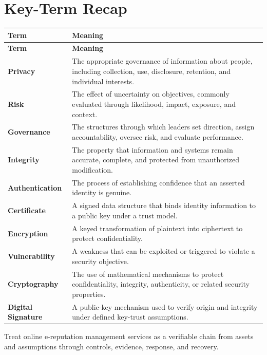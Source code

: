 \documentclass[11pt]{article}
\begin{document}
\section*{Key-Term Recap}
\begin{longtable}{>{\RaggedRight\arraybackslash}p{}>{\RaggedRight\arraybackslash}p{}}
\toprule\rowcolor{Navy}\color{white}\textbf{Term} & \color{white}\textbf{Meaning}\\\midrule
\endfirsthead
\toprule\rowcolor{Navy}\color{white}\textbf{Term} & \color{white}\textbf{Meaning}\\\midrule
\endhead
\textbf{Privacy} & The appropriate governance of information about people, including collection, use, disclosure, retention, and individual interests. \\\midrule
\textbf{Risk} & The effect of uncertainty on objectives, commonly evaluated through likelihood, impact, exposure, and context. \\\midrule
\textbf{Governance} & The structures through which leaders set direction, assign accountability, oversee risk, and evaluate performance. \\\midrule
\textbf{Integrity} & The property that information and systems remain accurate, complete, and protected from unauthorized modification. \\\midrule
\textbf{Authentication} & The process of establishing confidence that an asserted identity is genuine. \\\midrule
\textbf{Certificate} & A signed data structure that binds identity information to a public key under a trust model. \\\midrule
\textbf{Encryption} & A keyed transformation of plaintext into ciphertext to protect confidentiality. \\\midrule
\textbf{Vulnerability} & A weakness that can be exploited or triggered to violate a security objective. \\\midrule
\textbf{Cryptography} & The use of mathematical mechanisms to protect confidentiality, integrity, authenticity, or related security properties. \\\midrule
\textbf{Digital Signature} & A public-key mechanism used to verify origin and integrity under defined key-trust assumptions. \\\midrule
\bottomrule
\end{longtable}
\begin{takeawaybox}
Treat online e-reputation management services as a verifiable chain from assets and assumptions through controls, evidence, response, and recovery.
\end{takeawaybox}
\end{document}
